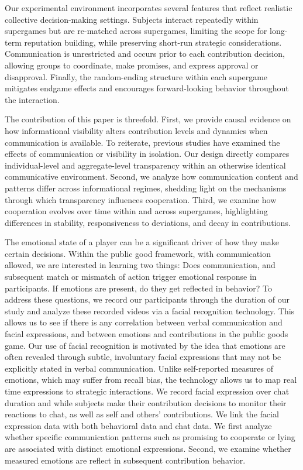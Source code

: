 \documentclass[12pt,letterpaper,english]{article}
\begin{document}
Our experimental environment incorporates several features that reflect realistic collective decision-making settings. Subjects interact repeatedly within supergames but are re-matched across supergames, limiting the scope for long-term reputation building, while preserving short-run strategic considerations. Communication is unrestricted and occurs prior to each contribution decision, allowing groups to coordinate, make promises, and express approval or disapproval. Finally, the random-ending structure within each supergame mitigates endgame effects and encourages forward-looking behavior throughout the interaction.

The contribution of this paper is threefold. First, we provide causal evidence on how informational visibility alters contribution levels and dynamics when communication is available. To reiterate, previous studies have examined the effects of communication or visibility in isolation. Our design directly compares individual-level and aggregate-level transparency within an otherwise identical communicative environment. Second, we analyze how communication content and patterns differ across informational regimes, shedding light on the mechanisms through which transparency influences cooperation. Third, we examine how cooperation evolves over time within and across supergames, highlighting differences in stability, responsiveness to deviations, and decay in contributions.

The emotional state of a player can be a significant driver of how they make certain decisions. Within the public good framework, with communication allowed, we are interested in learning two things: Does communication, and subsequent match or mismatch of action trigger emotional response in participants. If emotions are present, do they get reflected in behavior? To address these questions, we record our participants through the duration of our study and analyze these recorded videos via a facial recognition technology. This allows us to see if there is any correlation between verbal communication and facial expressions, and between emotions and contributions in the public goods game. Our use of facial recognition is motivated by the idea that emotions are often revealed through subtle, involuntary facial expressions that may not be explicitly stated in verbal communication. Unlike self-reported measures of emotions, which may suffer from recall bias, the technology allows us to map real time expressions to strategic interactions. We record facial expression over chat duration and while subjects make their contribution decisions to monitor their reactions to chat, as well as self and others' contributions. We link the facial expression data with both behavioral data and chat data. We first analyze whether specific communication patterns such as promising to cooperate or lying are associated with distinct emotional expressions. Second, we examine whether measured emotions are reflect in subsequent contribution behavior.
\end{document}
